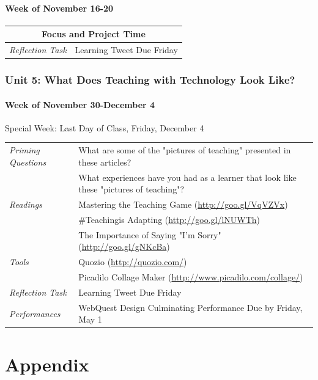 \documentclass{tufte-handout}
\newcommand{\tabpq}{\faQuestionCircle\medspace\textit{Priming Questions}}
\newcommand{\tabread}{\faBook\medspace\textit{Readings}}
\newcommand{\tabperformance}{\faTasks\medspace\textit{Performances}}
\newcommand{\tabtools}{\faWrench\medspace\textit{Tools}}
\newcommand{\tabtweet}{\faLightbulbO\medspace\textit{Reflection Task} & Learning Tweet Due Friday \\}
\newenvironment{tabsched}
	{\small
	\begin{tabular}{p{1.5in}p{4.5in}}
	\toprule}
	{\bottomrule
	\end{tabular}
	\normalsize}
\newenvironment{specweek}
	{\begin{center}
		\fontseries{b} \faBullhorn \medspace Special Week: }
		{\medspace \faBullhorn \fontseries{m}
	\end{center}}
\newcommand{\weekfourteen}{November 16-20}
\newcommand{\weekfifteen}{November 30-December 4}
\newcommand{\finisemester}{Last Day of Class, Friday, December 4}
\begin{document}
\subsection{Week of \weekfourteen}

\begin{tabsched}
	\multicolumn{2}{c}{\textbf{Focus and Project Time}} \\
	\midrule
	\tabtweet
\end{tabsched}

\section{Unit 5: What Does Teaching with Technology Look Like?}

\subsection{Week of \weekfifteen}

\begin{specweek}\finisemester\end{specweek}

\begin{tabsched}
	\tabpq & What are some of the "pictures of teaching" presented in these articles? \\
	& What experiences have you had as a learner that look like these "pictures of teaching"? \\
	\midrule
	\tabread & Mastering the Teaching Game (\url{http://goo.gl/VqVZVx}) \\
	& \#Teachingis Adapting (\url{http://goo.gl/lNUWTh}) \\
	& The Importance of Saying "I'm Sorry" (\url{http://goo.gl/gNKcBa}) \\
	\midrule
	\tabtools & Quozio (\url{http://quozio.com/}) \\
	& Picadilo Collage Maker (\url{http://www.picadilo.com/collage/}) \\
	\midrule
	\tabtweet
	\midrule
	\tabperformance & WebQuest Design Culminating Performance Due by Friday, May 1 \\
\end{tabsched}

\newpage



\newpage

\part{Appendix}
\end{document}
